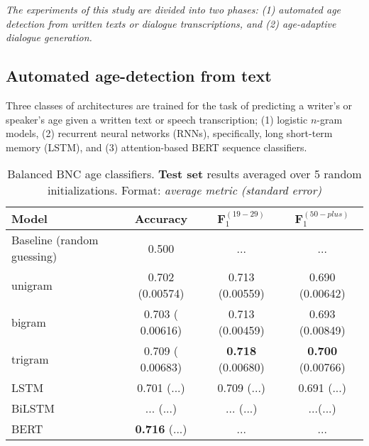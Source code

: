 \textit{The experiments of this study are divided into two phases: (1) automated age detection from written texts or dialogue transcriptions, and (2) age-adaptive dialogue generation.}

\subsection{Automated age-detection from text}

Three classes of architectures are trained for the task of predicting a writer's or speaker's age given a written text or speech transcription; (1) logistic $n$-gram models, (2) recurrent neural networks (RNNs), specifically, long short-term memory (LSTM), and (3) attention-based BERT sequence classifiers.

\begin{table}[H]
    \centering
    \begin{tabular}{l c c c}
    \hline
    \textbf{Model} & \textbf{Accuracy} & $\boldsymbol{F}_1^{(19-29)}$  & $\boldsymbol{F}_1^{(50-plus)}$ \\
    \hline
    Baseline (random guessing) & 0.500 & ... & ...\\
    unigram & 0.702 (0.00574) & 0.713 (0.00559)  & 0.690 (0.00642)\\
    bigram & 0.703 ( 0.00616) & 0.713 (0.00459) & 0.693 (0.00849)\\
    trigram &  0.709 ( 0.00683) & \textbf{0.718} (0.00680) & \textbf{0.700} (0.00766)\\
    LSTM & 0.701 (...) & 0.709 (...) & 0.691 (...)\\
    BiLSTM & ... (...) & ... (...) & ...(...) \\
    BERT & \textbf{0.716} (...) & ... & ...\\
    \hline
    \end{tabular}
    \caption{Balanced BNC age classifiers. \textbf{Test set} results averaged over 5 random initializations. Format: \textit{average metric (standard error)}}
    \label{tab:bnc_classification}
\end{table}

